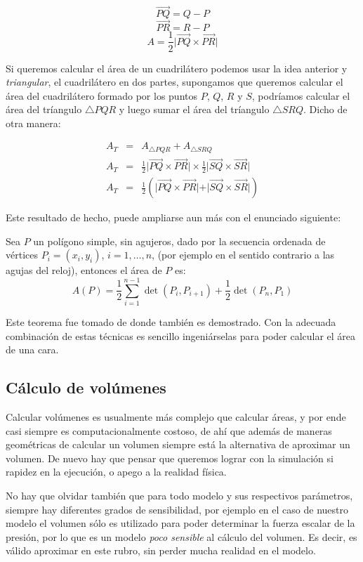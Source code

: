 $$\overrightarrow{PQ} = Q - P$$
$$\overrightarrow{PR} = R - P$$
$$ A = \frac{1}{2} \vert \overrightarrow{PQ} \times \overrightarrow{PR} \vert$$

Si queremos calcular el área de un cuadrilátero podemos usar la idea anterior y \emph{triangular}, el cuadrilátero en dos partes, supongamos que queremos calcular el área del cuadrilátero formado por los puntos $P$, $Q$, $R$ y $S$, podríamos calcular el área del tríangulo $\triangle PQR$ y luego sumar el área del tríangulo $\triangle SRQ$. Dicho de otra manera:

\begin{eqnarray} 
A_{T} & = & A_{\triangle PQR} + A_{\triangle SRQ} \nonumber \\
A_{T} & = & \frac{1}{2} \vert \overrightarrow{PQ} \times \overrightarrow{PR} \vert \times \frac{1}{2} \vert \overrightarrow{SQ} \times \overrightarrow{SR} \vert \nonumber \\
\label{formulaArea}
A_{T} & = & \frac{1}{2} \left( \vert \overrightarrow{PQ} \times \overrightarrow{PR} \vert + \vert \overrightarrow{SQ} \times \overrightarrow{SR} \vert \right)
\end{eqnarray}

Este resultado de hecho, puede ampliarse aun más con el enunciado siguiente:

Sea $P$ un polígono simple, sin agujeros, dado por la secuencia ordenada de vértices $P_i = (x_i, y_i)$, $i = 1,\ldots,n$, (por ejemplo en el sentido contrario a las agujas del reloj), entonces el área de $P$ es:
$$A(P) = \frac{1}{2}\sum^{n-1}_{i = 1} \det (P_i, P_{i + 1}) + \frac{1}{2} \det (P_n, P_1)$$

Este teorema fue tomado de \cite{GeometriaParaCAD} donde también es demostrado. Con la adecuada combinación de estas técnicas es sencillo ingeniárselas para poder calcular el área de una cara.

\subsection{Cálculo de volúmenes}
Calcular volúmenes es usualmente más complejo que calcular áreas, y por ende casi siempre es computacionalmente costoso, de ahí que además de maneras geométricas de calcular un volumen siempre está la alternativa de aproximar un volumen. De nuevo hay que pensar que queremos lograr con la simulación si rapidez en la ejecución, o apego a la realidad física.

No hay que olvidar también que para todo modelo y sus respectivos parámetros, siempre hay diferentes grados de sensibilidad, por ejemplo en el caso de nuestro modelo el volumen sólo es utilizado para poder determinar la fuerza escalar de la presión, por lo que es un modelo \emph{poco sensible} al cálculo del volumen. Es decir, es válido aproximar en este rubro, sin perder mucha realidad en el modelo.

